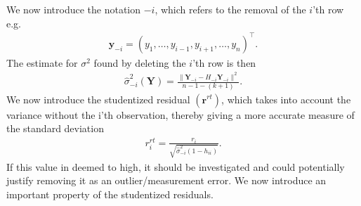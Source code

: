 We now introduce the notation $-i$, which refers to the removal of the $i$'th row e.g.
\begin{align*}
    \textbf{y}_{-i} = (y_1, \ldots, y_{i-1}, y_{i+1}, \ldots, y_n)^\top.
\end{align*}
The estimate for $\sigma^2$ found by deleting the $i$'th row is then
\begin{align*}
    \hat{\sigma}^2_{-i}(\textbf{Y}) = \frac{\| \textbf{Y}_{-i} - H_{-i} \textbf{Y}_{-i} \|^2}{n-1-(k+1)}.
\end{align*}
We now introduce the studentized residual $(\textbf{r}^{rt})$, which takes into account the variance without the i'th observation, thereby giving a more accurate measure of the standard deviation
\begin{align*}
    r_i^{rt} = \frac{r_i}{\sqrt{\hat{\sigma}^2_{-i}(1-h_{ii})}}.
\end{align*}
If this value in deemed to high, it should be investigated and could potentially justify removing it as an outlier/measurement error. We now introduce an important property of the studentized residuals.


